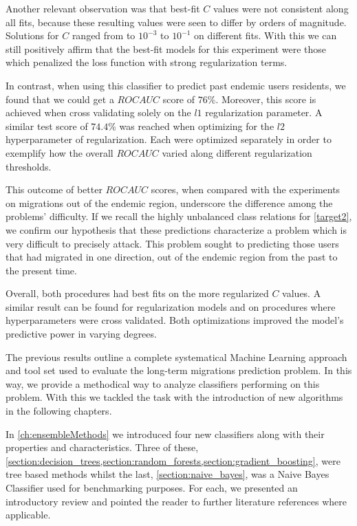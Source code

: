 Another relevant observation was that best-fit $C$ values were not consistent along all fits, because these resulting values were seen to differ by orders of magnitude.
	Solutions for $C$ ranged from to $10^{-3}$ to $10^{-1}$ on different fits.
With this we can still positively affirm that the best-fit models for this experiment were those which penalized the loss function with strong regularization terms.


In contrast, when using this classifier to predict past endemic users residents, we found that we could get a $ROC AUC$ score of $76\%$.
Moreover, this score is achieved when cross validating solely on the $l1$ regularization parameter.
A similar test score of $74.4\%$ was reached when optimizing for the $l2$ hyperparameter of regularization.
Each were optimized separately in order to exemplify how the overall $ROC AUC$ varied along different regularization thresholds.

This outcome of better $ROC AUC$ scores, when compared with the experiments on migrations out of the endemic region, underscore the difference among the problems' difficulty.
If we recall the highly unbalanced class relations for \cref{target2}, we confirm our hypothesis that these predictions characterize a problem which is very difficult to precisely attack.
This problem sought to predicting those users that had migrated in one direction, out of the endemic region from the past to the present time.

Overall, both procedures had best fits on the more regularized $C$ values.
A similar result can be found for regularization models and on procedures where hyperparameters were cross validated.
Both optimizations improved the model's predictive power in varying degrees.


The previous results outline a complete systematical Machine Learning approach and tool set used to evaluate the long-term migrations prediction problem.
In this way, we provide a methodical way to analyze classifiers performing on this problem.
With this we tackled the task with the introduction of new algorithms in the following chapters.



In \cref{ch:ensembleMethods} we introduced four new classifiers along with their properties and characteristics. Three of these, \cref{section:decision_trees,section:random_forests,section:gradient_boosting}, were tree based methods whilst the last, \cref{section:naive_bayes}, was a Naive Bayes Classifier used for benchmarking purposes.
For each, we presented an introductory review and pointed the reader to further literature references where applicable.

